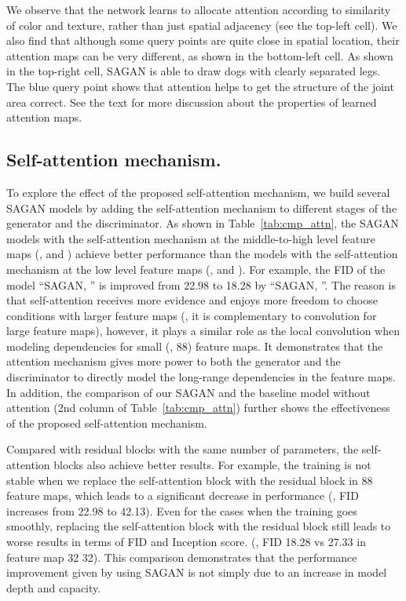 \documentclass{article}
\begin{document}
\begin{figure*}[tb]
{    We observe that the network learns to allocate attention according to similarity of color and texture, rather than just spatial adjacency (see the top-left cell). 
We also find that although some query points are quite close in spatial location, their attention maps can be very different, as shown in the bottom-left cell. 
As shown in the top-right cell, SAGAN is able to draw dogs with clearly separated legs. 
    The blue query point shows that attention helps to get the structure of the joint area correct. 
    See the text for more discussion about the properties of learned attention maps. 
    }
\label{fig:attention}
    \vspace{-8pt}
 \end{figure*}


\subsection{Self-attention mechanism.} \label{sec:sagan_component}

To explore the effect of the proposed self-attention mechanism, we build several SAGAN models by adding the self-attention mechanism to different stages of the generator and the discriminator. As shown in Table~\ref{tab:cmp_attn}, the SAGAN models with the self-attention mechanism at the middle-to-high level feature maps (\eg,  and ) achieve better performance than the models with the self-attention mechanism at the low level feature maps (\eg,  and ). For example, the FID of the model ``SAGAN, '' is improved from 22.98 to 18.28 by ``SAGAN, ''. The reason is that self-attention receives more evidence and enjoys more freedom to choose conditions with larger feature maps (\ie, it is complementary to convolution for large feature maps), however, it plays a similar role as the local convolution when modeling dependencies for small (\eg, 88) feature maps. It demonstrates that the attention mechanism gives more power to both the generator and the discriminator to directly model the long-range dependencies in the feature maps. In addition, the comparison of our SAGAN and the baseline model without attention (2nd column of Table~\ref{tab:cmp_attn}) further shows the effectiveness of the proposed self-attention mechanism.


Compared with residual blocks with the same number of parameters, the self-attention blocks also achieve better results. For example, the training is not stable when we replace the self-attention block with the residual block in 88 feature maps, which leads to a significant decrease in performance (\eg, FID increases from 22.98 to 42.13). Even for the cases when the training goes smoothly, replacing the self-attention block with the residual block still leads to worse results in terms of FID and Inception score. (\eg, FID 18.28 vs 27.33 in feature map 32  32). This comparison demonstrates that the performance improvement given by using SAGAN is not simply due to an increase in model depth and capacity. 
\end{document}
